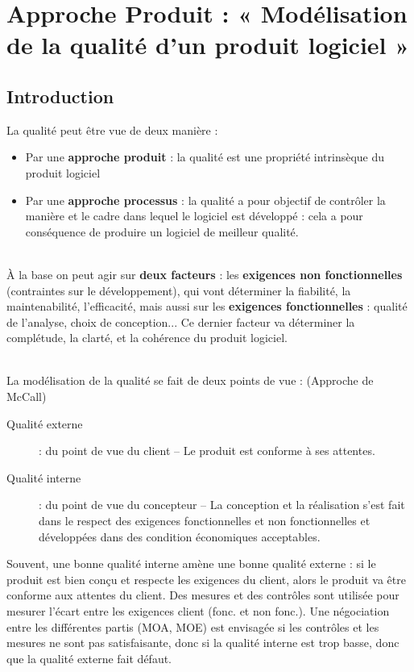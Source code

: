 \chapter{Approche Produit : « Modélisation de la qualité d’un produit logiciel »}

\section{Introduction}

La qualité peut être vue de deux manière :
\begin{itemize}
\item Par une \textbf{approche produit} : la qualité est une propriété intrinsèque du produit logiciel
\item Par une \textbf{approche processus} : la qualité a pour objectif de contrôler la manière et le cadre 	dans lequel le logiciel est développé : cela a pour conséquence de produire un logiciel de meilleur qualité.
\end{itemize}

\hfill\\

À la base on peut agir sur \textbf{deux facteurs} : les \textbf{exigences non fonctionnelles} (contraintes sur le développement), qui vont déterminer la fiabilité, la maintenabilité, l'efficacité, mais aussi sur les \textbf{exigences fonctionnelles} : qualité de l'analyse, choix de conception... Ce dernier facteur va déterminer la complétude, la clarté, et la cohérence du produit logiciel.

\hfill\\

La modélisation de la qualité se fait de deux points de vue : (Approche de McCall)
\begin{description}
\item[Qualité externe] : du point de vue du client – Le produit est conforme à ses attentes.
\item[Qualité interne] : du point  de vue du concepteur – La conception et la réalisation s'est fait dans le respect des exigences fonctionnelles et non fonctionnelles et développées dans des condition économiques acceptables.
\end{description}

Souvent, une bonne qualité interne amène une bonne qualité externe : si le produit est bien conçu et respecte les exigences du client, alors le produit va être conforme aux attentes du client. Des mesures et des contrôles sont utilisée pour mesurer l'écart entre les exigences client (fonc. et non fonc.). Une négociation entre les différentes partis (MOA, MOE) est envisagée si les contrôles et les mesures ne sont pas satisfaisante, donc si la qualité interne est trop basse, donc que la qualité externe fait défaut.

